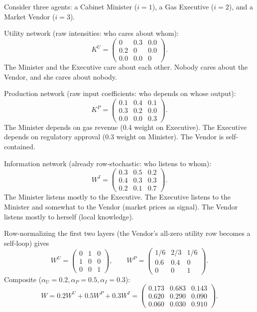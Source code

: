 \documentclass[../structural_economics_book.tex]{subfiles}
\begin{document}
\begin{example}\label{ch05:ex:LaPaz}
Consider three agents: a Cabinet Minister ($i=1$), a Gas Executive ($i=2$), and a Market Vendor ($i=3$). \textup{\illustrative}

Utility network (raw intensities: who cares about whom):
\begin{equation}
K^U = \begin{pmatrix} 0 & 0.3 & 0.0 \\ 0.2 & 0 & 0.0 \\ 0.0 & 0.0 & 0 \end{pmatrix}.
\end{equation}
The Minister and the Executive care about each other. Nobody cares about the Vendor, and she cares about nobody.

Production network (raw input coefficients: who depends on whose output):
\begin{equation}
K^P = \begin{pmatrix} 0.1 & 0.4 & 0.1 \\ 0.3 & 0.2 & 0.0 \\ 0.0 & 0.0 & 0.3 \end{pmatrix}.
\end{equation}
The Minister depends on gas revenue (0.4 weight on Executive). The Executive depends on regulatory approval (0.3 weight on Minister). The Vendor is self-contained.

Information network (already row-stochastic: who listens to whom):
\begin{equation}
W^I = \begin{pmatrix} 0.3 & 0.5 & 0.2 \\ 0.4 & 0.3 & 0.3 \\ 0.2 & 0.1 & 0.7 \end{pmatrix}.
\end{equation}
The Minister listens mostly to the Executive. The Executive listens to the Minister and somewhat to the Vendor (market prices as signal). The Vendor listens mostly to herself (local knowledge).

Row-normalizing the first two layers (the Vendor's all-zero utility row becomes a self-loop) gives
\begin{equation}
W^U = \begin{pmatrix} 0 & 1 & 0 \\ 1 & 0 & 0 \\ 0 & 0 & 1 \end{pmatrix}, \qquad
W^P = \begin{pmatrix} 1/6 & 2/3 & 1/6 \\ 0.6 & 0.4 & 0 \\ 0 & 0 & 1 \end{pmatrix}.
\end{equation}
Composite ($\alpha_U = 0.2, \alpha_P = 0.5, \alpha_I = 0.3$):
\begin{equation}
W = 0.2 W^U + 0.5 W^P + 0.3 W^I = \begin{pmatrix} 0.173 & 0.683 & 0.143 \\ 0.620 & 0.290 & 0.090 \\ 0.060 & 0.030 & 0.910 \end{pmatrix}.
\end{equation}


\end{example}
\end{document}
